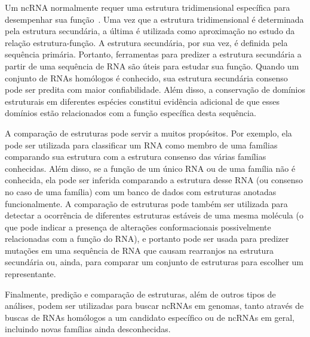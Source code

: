 Um ncRNA normalmente requer uma estrutura tridimensional específica para desempenhar sua função~\citep{schuster1997rna:1997,torres2005crystal:2005}.
Uma vez que a estrutura tridimensional é determinada pela estrutura secundária, a última é utilizada como aproximação no estudo da relação estrutura-função. A estrutura secundária, por sua vez, é definida pela sequência primária. Portanto, ferramentas para predizer a estrutura secundária a partir de uma sequência de RNA são úteis para estudar sua função. Quando um conjunto de RNAs homólogos é conhecido, sua estrutura secundária consenso pode ser predita com maior confiabilidade. Além disso, a conservação de domínios estruturais em diferentes espécies constitui evidência adicional de que esses domínios estão relacionados com a função específica desta sequência.


A comparação de estruturas pode servir a muitos propósitos. Por exemplo, ela pode ser utilizada para classificar um RNA como membro de uma famílias comparando sua estrutura com a estrutura consenso das várias famílias conhecidas. Além disso, se a função de um único RNA ou de uma família não é conhecida, ela pode ser inferida comparando a estrutura desse RNA (ou consenso no caso de uma família) com um banco de dados com estruturas anotadas funcionalmente. A comparação de estruturas pode também ser utilizada para detectar a ocorrência de diferentes estruturas estáveis de uma mesma molécula (o que pode indicar a presença de alterações conformacionais possivelmente relacionadas com a função do RNA), e portanto pode ser usada para predizer mutações em uma sequência de RNA que causam rearranjos na estrutura secundária ou, ainda, para comparar um conjunto de estruturas para escolher um representante.

Finalmente, predição e comparação de estruturas, além de outros tipos de análises, podem ser utilizadas para buscar ncRNAs em genomas, tanto através de buscas de RNAs homólogos a um candidato específico ou de ncRNAs em geral, incluindo novas famílias ainda desconhecidas.



